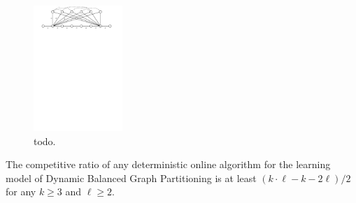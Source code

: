 \documentclass[a4paper,anonymous,USenglish]{lipics-v2019}
\begin{document}
\begin{figure}[H]
	\centering
	\includegraphics[width=0.3\textwidth]{figs/substitute}
	\caption{todo.}
	\label{fig:lb}
\end{figure}


\begin{theorem}
	\label{th:lowerbound}
	The competitive ratio of any deterministic online algorithm for the learning model of Dynamic Balanced Graph Partitioning is at least $(k\cdot \ell - k - 2\ell)/2$ for any $k\geq 3$ and $\ell \geq 2$.
\end{theorem}
\end{document}
